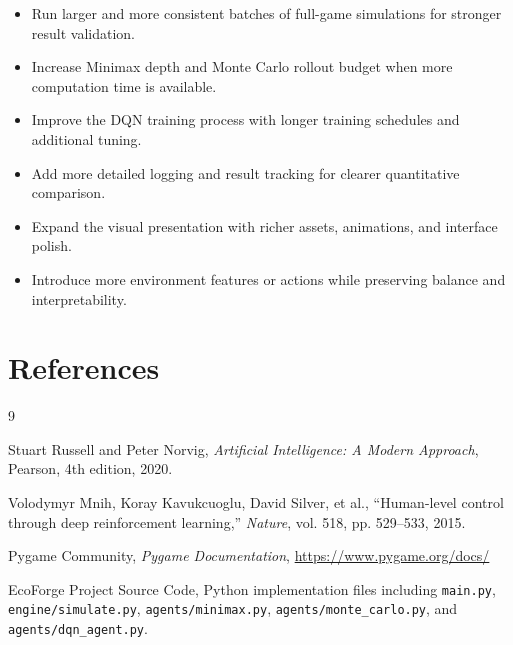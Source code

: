 \documentclass[12pt,a4paper]{article}
\begin{document}
\begin{itemize}[leftmargin=1.5cm]
    \item Run larger and more consistent batches of full-game simulations for stronger result validation.
    \item Increase Minimax depth and Monte Carlo rollout budget when more computation time is available.
    \item Improve the DQN training process with longer training schedules and additional tuning.
    \item Add more detailed logging and result tracking for clearer quantitative comparison.
    \item Expand the visual presentation with richer assets, animations, and interface polish.
    \item Introduce more environment features or actions while preserving balance and interpretability.
\end{itemize}

\clearpage
\section{References}

\begin{thebibliography}{9}

Stuart Russell and Peter Norvig,
\textit{Artificial Intelligence: A Modern Approach},
Pearson, 4th edition, 2020.

Volodymyr Mnih, Koray Kavukcuoglu, David Silver, et al.,
``Human-level control through deep reinforcement learning,''
\textit{Nature}, vol. 518, pp. 529--533, 2015.

Pygame Community,
\textit{Pygame Documentation},
\url{https://www.pygame.org/docs/}

EcoForge Project Source Code,
Python implementation files including \texttt{main.py}, 
\texttt{engine/simulate.py}, \texttt{agents/minimax.py}, 
\texttt{agents/monte\_carlo.py}, and 
\texttt{agents/dqn\_agent.py}.

\end{thebibliography}
\end{document}
